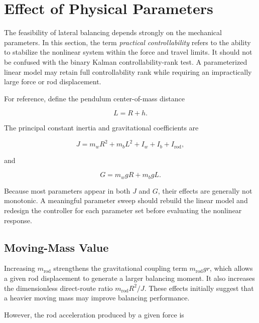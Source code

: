 \section{Effect of Physical Parameters}
\label{sec:further-physical-parameters}

The feasibility of lateral balancing depends strongly on the mechanical
parameters. In this section, the term \emph{practical controllability} refers
to the ability to stabilize the nonlinear system within the force and travel
limits. It should not be confused with the binary Kalman controllability-rank
test. A parameterized linear model may retain full controllability rank while
requiring an impractically large force or rod displacement.

For reference, define the pendulum center-of-mass distance

\begin{equation}
L=R+h.
\end{equation}

The principal constant inertia and gravitational coefficients are

\begin{equation}
J
=
m_wR^2
+m_bL^2
+I_w
+I_b
+I_{\mathrm{rod}},
\label{eq:parameter-study-inertia}
\end{equation}

and

\begin{equation}
G
=
m_wgR
+m_bgL.
\label{eq:parameter-study-gravity}
\end{equation}

Because most parameters appear in both $J$ and $G$, their effects are generally
not monotonic. A meaningful parameter sweep should rebuild the linear model and
redesign the controller for each parameter set before evaluating the nonlinear
response.

\subsection{Moving-Mass Value}

Increasing $m_{\mathrm{rod}}$ strengthens the gravitational coupling term
$m_{\mathrm{rod}}gr$, which allows a given rod displacement to generate a
larger balancing moment. It also increases the dimensionless direct-route
ratio $m_{\mathrm{rod}}R^2/J$. These effects initially suggest that a heavier
moving mass may improve balancing performance.

However, the rod acceleration produced by a given force is

